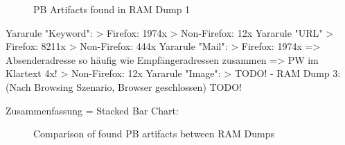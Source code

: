 \begin{figure}[h!]
{			}
			\hspace*{\fill}
			\label{chart:final-criteria}  
			\caption{PB Artifacts found in RAM Dump 1}
		\end{figure}	
		Yararule "Keyword":
			> Firefox: 1974x
			> Non-Firefox: 12x
		Yararule "URL"
			> Firefox: 8211x
			> Non-Firefox: 444x		
		Yararule "Mail":
			> Firefox: 1974x
				=> Absenderadresse so häufig wie Empfängeradressen zusammen
				=> PW im Klartext 4x!
			> Non-Firefox: 12x
		Yararule "Image":
			> TODO!
	- RAM Dump 3: (Nach Browsing Szenario, Browser geschlossen)
		TODO!

Zusammenfassung = Stacked Bar Chart:
\begin{figure}[h!]
	\label{chart:final-criteria}  
	\caption{Comparison of found PB artifacts between RAM Dumps}
\end{figure}

